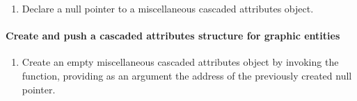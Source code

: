 \documentclass[letterpaper,12pt,english,openany,oneside]{sphinxmanual}
\begin{document}
\begin{sphinxVerbatim}[commandchars=\\\{\}]
 
\end{sphinxVerbatim}
\begin{enumerate}
%
\setcounter{enumi}{1}
\item {} 
Declare a null pointer to a miscellaneous cascaded attributes object.

\end{enumerate}

\begin{sphinxVerbatim}[commandchars=\\\{\}]
 
\end{sphinxVerbatim}


\paragraph{Create and push a cascaded attributes structure for graphic entities}
\label{\detokenize{Plugins_A3D_API:create-and-push-a-cascaded-attributes-structure-for-graphic-entities}}\begin{enumerate}
%
\item {} 
Create an empty miscellaneous cascaded attributes object by invoking the  function, providing as an argument the address of the previously created null pointer.

\end{enumerate}
\end{document}
